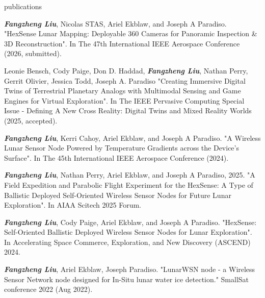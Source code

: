 \documentclass{resume} %
\begin{document}
\break


\begin{rSection}{publications}
\begin{itemlabel}
\item \textbf{\textit{Fangzheng Liu}}, Nicolas STAS, Ariel Ekblaw, and Joseph A Paradiso.
"HexSense Lunar Mapping: Deployable 360 Cameras for Panoramic Inspection \& 3D Reconstruction".
In The 47th International IEEE Aerospace Conference (2026, submitted).
\smallskip

\item Leonie Bensch, Cody Paige, Don D. Haddad, \textbf{\textit{Fangzheng Liu}},
Nathan Perry, Gerrit Olivier, Jessica Todd, Joseph A. Paradiso
"Creating Immersive Digital Twins of Terrestrial Planetary Analogs with Multimodal Sensing and Game Engines for Virtual Exploration".
In The IEEE Pervasive Computing Special Issue - Defining A New Cross Reality: Digital Twins and Mixed Reality Worlds (2025, accepted).
\smallskip

\item \textbf{\textit{Fangzheng Liu}}, Kerri Cahoy, Ariel Ekblaw, and Joseph A Paradiso.
"A Wireless Lunar Sensor Node Powered by Temperature Gradients across the Device's Surface".
In The 45th International IEEE Aerospace Conference (2024).
\smallskip

\item \textbf{\textit{Fangzheng Liu}}, Nathan Perry, Ariel Ekblaw, and Joseph A Paradiso, 2025.
"A Field Expedition and Parabolic Flight Experiment for the HexSense: A Type of Ballistic
Deployed Self-Oriented Wireless Sensor Nodes for Future Lunar Exploration".
In AIAA Scitech 2025 Forum.
\smallskip

\item \textbf{\textit{Fangzheng Liu}},
Cody Paige, Ariel Ekblaw, and Joseph A Paradiso.
"HexSense: Self-Oriented Ballistic Deployed Wireless Sensor Nodes for Lunar Exploration".
In Accelerating Space Commerce, Exploration, and New Discovery (ASCEND) 2024.
\smallskip

\item \textbf{\textit{Fangzheng Liu}}, Ariel Ekblaw, Joseph Paradiso.
"LunarWSN node - a Wireless Sensor Network node designed for In-Situ lunar water ice detection."
SmallSat conference 2022 (Aug 2022).
\smallskip


\end{itemlabel}
\end{rSection}
\end{document}
